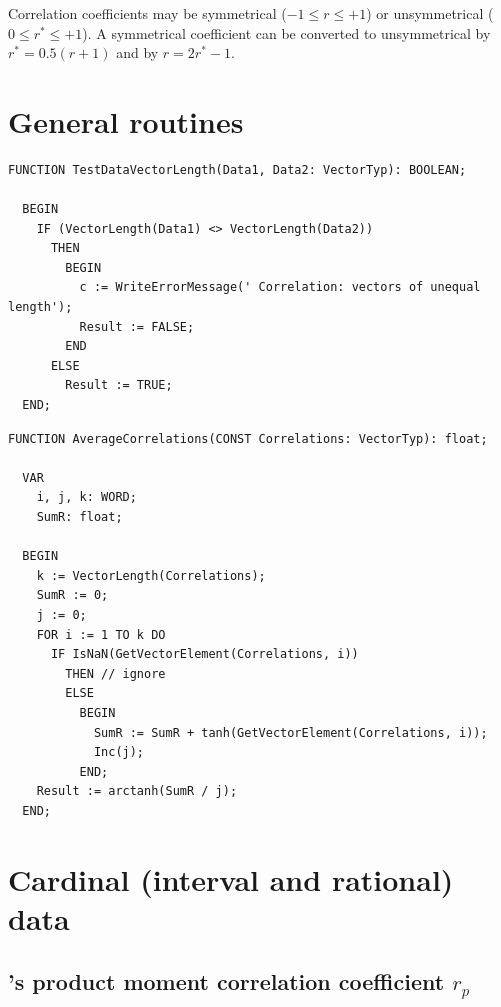\begin{refsection}
Correlation coefficients may be symmetrical (\( -1 \leq r \leq +1 \)) or unsymmetrical (\( 0 \leq r^* \leq +1 \)). A symmetrical coefficient can be converted to unsymmetrical by \( r^* = 0.5 (r +1) \) and  by \( r = 2r^* - 1 \).

\section{General routines}

\begin{lstlisting}[caption=Test for equal vector length ]
  FUNCTION TestDataVectorLength(Data1, Data2: VectorTyp): BOOLEAN;

  BEGIN
    IF (VectorLength(Data1) <> VectorLength(Data2))
      THEN
        BEGIN
          c := WriteErrorMessage(' Correlation: vectors of unequal length');
          Result := FALSE;
        END
      ELSE
        Result := TRUE;
  END;
\end{lstlisting}

\begin{lstlisting}[caption= Average of several correlation coefficients ]
  FUNCTION AverageCorrelations(CONST Correlations: VectorTyp): float;

  VAR
    i, j, k: WORD;
    SumR: float;

  BEGIN
    k := VectorLength(Correlations);
    SumR := 0;
    j := 0;
    FOR i := 1 TO k DO
      IF IsNaN(GetVectorElement(Correlations, i))
        THEN // ignore
        ELSE
          BEGIN
            SumR := SumR + tanh(GetVectorElement(Correlations, i));
            Inc(j);
          END;
    Result := arctanh(SumR / j);
  END;
\end{lstlisting}


\section{Cardinal (interval and rational) data}

\subsection{'s product moment correlation coefficient \(r_p \)}\label{text:Pearson}


\end{refsection}
